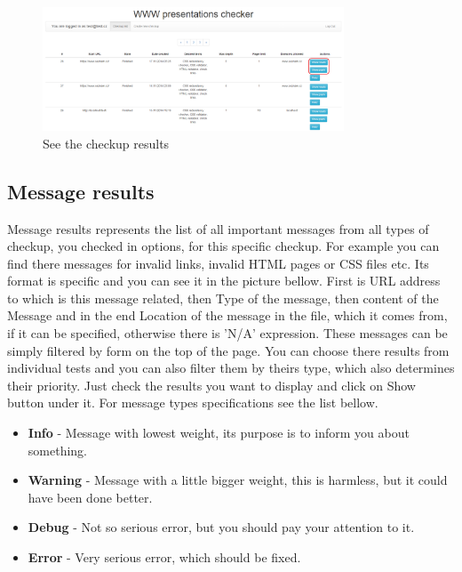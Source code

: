 \documentclass[12pt,a4paper]{article}
\begin{document}
\begin{figure}[H]
    \centering
    \includegraphics[width=0.8\textwidth]{pictures/results.png}
		\caption{See the checkup results}
		\label{fig:results}
\end{figure}

\subsection{Message results} \label{messages}
Message results represents the list of all important messages from all types of checkup, you checked in options, for this specific checkup. For example you can find there messages for invalid links, invalid HTML pages or CSS files etc. Its format is specific and you can see it in the picture bellow. First is URL address to which is this message related, then Type of the message, then content of the Message and in the end Location of the message in the file, which it comes from, if it can be specified, otherwise there is 'N/A' expression. These messages can be simply filtered by form on the top of the page. You can choose there results from individual tests and you can also filter them by theirs type, which also determines their priority. Just check the results you want to display and click on Show button under it. For message types specifications see the list bellow.
\begin{itemize}
	\item \textbf{Info} - Message with lowest weight, its purpose is to inform you about something.
	\item \textbf{Warning} - Message with a little bigger weight, this is harmless, but it could have been done better.
	\item \textbf{Debug} - Not so serious error, but you should pay your attention to it.
	\item \textbf{Error} - Very serious error, which should be fixed.
\end{itemize}
\end{document}
